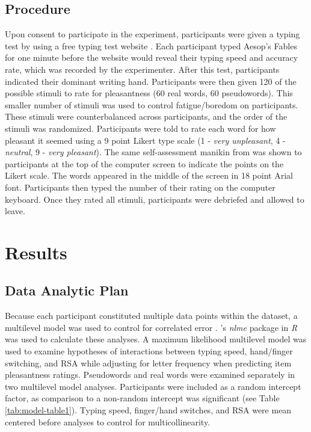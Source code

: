 \documentclass[english,man,man,mask]{apa6}
\theoremstyle{definition}
\theoremstyle{definition}
\theoremstyle{definition}
\theoremstyle{remark}
\begin{document}
\subsection{Procedure}\label{procedure}

Upon consent to participate in the experiment, participants were given a
typing test by using a free typing test website \autocite{Inc2013}. Each
participant typed Aesop's Fables for one minute before the website would
reveal their typing speed and accuracy rate, which was recorded by the
experimenter. After this test, participants indicated their dominant
writing hand. Participants were then given 120 of the possible stimuli
to rate for pleasantness (60 real words, 60 pseudowords). This smaller
number of stimuli was used to control fatigue/boredom on participants.
These stimuli were counterbalanced across participants, and the order of
the stimuli was randomized. Participants were told to rate each word for
how pleasant it seemed using a 9 point Likert type scale (1 - \emph{very
unpleasant}, 4 - \emph{neutral}, 9 - \emph{very pleasant}). The same
self-assessment manikin from \textcite{Jasmin2012} was shown to
participants at the top of the computer screen to indicate the points on
the Likert scale. The words appeared in the middle of the screen in 18
point Arial font. Participants then typed the number of their rating on
the computer keyboard. Once they rated all stimuli, participants were
debriefed and allowed to leave.

\section{Results}\label{results}

\subsection{Data Analytic Plan}\label{data-analytic-plan}

Because each participant constituted multiple data points within the
dataset, a multilevel model was used to control for correlated error
\autocite{Gelman2006}. \textcite{Pinheiro2017}'s \emph{nlme} package in
\emph{R} was used to calculate these analyses. A maximum likelihood
multilevel model was used to examine hypotheses of interactions between
typing speed, hand/finger switching, and RSA while adjusting for letter
frequency when predicting item pleasantness ratings. Pseudowords and
real words were examined separately in two multilevel model analyses.
Participants were included as a random intercept factor, as comparison
to a non-random intercept was significant (see Table
\ref{tab:model-table1}). Typing speed, finger/hand switches, and RSA
were mean centered before analyses to control for multicollinearity.
\end{document}
